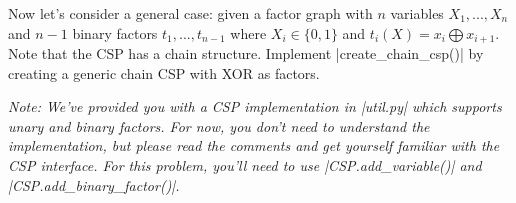 \item {}
Now let's consider a general case: given a factor graph with $n$ variables
$X_1,...,X_n$ and $n-1$ binary factors $t_1,...,t_{n-1}$ where $X_i \in \{0,1\}$
and $t_i(X) = x_i \bigoplus x_{i+1}$. Note that the CSP has a chain structure.
Implement |create_chain_csp()| by creating a generic chain CSP with XOR as
factors.

{\em Note: We've provided you with a CSP implementation in |util.py| which
supports unary and binary factors. For now, you don't need to understand the
implementation, but please read the comments and get yourself familiar with the
CSP interface. For this problem, you'll need to use |CSP.add_variable()| and
|CSP.add_binary_factor()|.}

